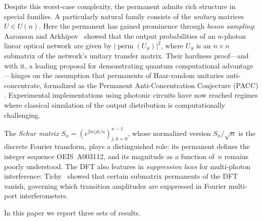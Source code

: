 \documentclass[11pt]{amsart}
\theoremstyle{definition}
\theoremstyle{remark}
\DeclareMathOperator{\perm}{perm}
\begin{document}
Despite this worst-case complexity, the permanent admits rich
structure in special families.  A particularly natural family consists
of the \emph{unitary} matrices $U\in U(n)$.  Here the permanent has
gained prominence through \emph{boson sampling}: Aaronson and
Arkhipov~\cite{AaronsonArkhipov13} showed that the output
probabilities of an $n$-photon linear optical network are given by
$|\perm(U_S)|^2$, where $U_S$ is an $n\times n$ submatrix of the
network's unitary transfer matrix.  Their hardness proof---and with it,
a leading proposal for demonstrating quantum computational
advantage---hinges on the assumption that permanents of Haar-random
unitaries anti-concentrate, formalized as the Permanent
Anti-Concentration Conjecture (PACC)
\cite{AaronsonArkhipov13,FeffermanGhoshZhan24}.  Experimental
implementations using photonic circuits
\cite{Zhong2020,Crespi2016} have now reached regimes where classical
simulation of the output distribution is computationally challenging.

The \emph{Schur matrix}
$S_n=(e^{2\pi i jk/n})_{j,k=0}^{n-1}$, whose normalized version
$S_n/\sqrt{n}$ is the discrete Fourier transform, plays a
distinguished role: its permanent defines the integer sequence
OEIS~A003112, and its magnitude as a function of~$n$ remains poorly
understood.  The DFT also features in \emph{suppression laws}
for multi-photon interference: Tichy~\cite{Tichy2014} showed that
certain submatrix permanents of the DFT vanish, governing which
transition amplitudes are suppressed in Fourier multi-port
interferometers.

\medskip

In this paper we report three sets of results.
\end{document}

